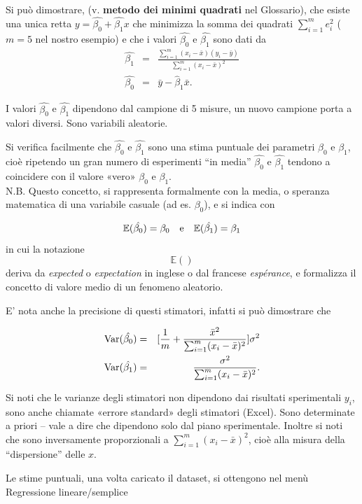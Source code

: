 \documentclass[
  11pt,
]{book}
\begin{document}
Si può dimostrare, (v. \textbf{metodo dei minimi quadrati} nel Glossario), che esiste una unica retta \(y=\hat{\beta_0}+\hat{\beta_1}x\) che minimizza la somma dei quadrati \(\sum_{i=1}^m e_i^2\) (\(m=5\) nel nostro esempio) e che i valori \(\hat{\beta_0}\) e \(\hat{\beta_1}\) sono dati da
\begin{eqnarray*}
\hat{\beta_1}&=&\frac{\sum_{i=1}^m (x_i-\bar{x})(y_i-\bar{y})}{\sum_{i=1}^m(x_i-\bar{x})^2} \\
\hat{\beta_0}&=&\bar{y}-\hat{\beta}_1\bar{x}.
\end{eqnarray*}

I valori \(\hat{\beta_0}\) e \(\hat{\beta_1}\) dipendono dal campione di 5 misure, un nuovo campione porta a valori diversi. Sono variabili aleatorie.

Si verifica facilmente che \(\hat{\beta_0}\) e \(\hat{\beta_1}\) sono una stima puntuale dei parametri \(\beta_0\) e \(\beta_1\), cioè ripetendo un gran numero di esperimenti ``in media'' \(\hat{\beta_0}\) e \(\hat{\beta_1}\) tendono a coincidere con il valore «vero» \(\beta_0\) e \(\beta_1\).\\
N.B. Questo concetto, si rappresenta formalmente con la media, o speranza matematica di una variabile casuale (ad es. \(\beta_0\)), e si indica con

\[
\mathbb{E}(\hat{\beta_0})=\beta_0 \quad \rm{e} \quad \mathbb{E}(\hat{\beta_1})=\beta_1
\]
in cui la notazione
\[
\mathbb{E}()
\]
deriva da \emph{expected} o \emph{expectation} in inglese o dal francese \emph{espérance}, e formalizza il concetto di valore medio di un fenomeno aleatorio.

E' nota anche la precisione di questi stimatori, infatti si può dimostrare che

\begin{eqnarray*}
\rm{Var}(\hat{\beta_0})&=&[\frac{1}{m}+\frac{\bar{x}^2}{\sum_{i=1}^m(x_i-\bar{x})^2}]\sigma^2\\
\rm{Var}(\hat{\beta_1})&=&\frac{\sigma^2}{\sum_{i=1}^m(x_i-\bar{x})^2} .
\end{eqnarray*}

Si noti che le varianze degli stimatori non dipendono dai risultati sperimentali \(y_i\), sono anche chiamate «errore standard» degli stimatori (Excel). Sono determinate a priori -- vale a dire che dipendono solo dal piano sperimentale.
Inoltre si noti che sono inversamente proporzionali a \(\sum_{i=1}^m(x_i-\bar{x})^2\), cioè alla misura della ``dispersione'' delle \(x\).

Le stime puntuali, una volta caricato il dataset, si ottengono nel menù Regressione lineare/semplice
\end{document}
